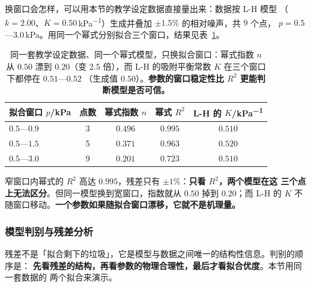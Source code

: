换窗口会怎样，可以用本节的教学设定数据直接量出来：数据按 L-H 模型
（$k=2.00$、$K=0.50$\,\unit{kPa^{-1}}）生成并叠加 $\pm1.5\%$ 的相对噪声，共 $9$ 个点，
$p=0.5$—$3.0$\,\unit{kPa}。用同一个幂式分别拟合三个窗口，结果见表~\ref{tab:ch10-window}。

\begin{table}[htbp]
\centering
\caption{同一套教学设定数据、同一个幂式模型，只换拟合窗口：幂式指数 $n$ 从 $0.50$ 漂到
$0.20$（变 $2.5$ 倍），而 L-H 的吸附平衡常数 $K$ 在三个窗口下都停在 $0.51$—$0.52$
（生成值 $0.50$）。\textbf{参数的窗口稳定性比 $R^2$ 更能判断模型是否可信。}
}
\label{tab:ch10-window}
\begin{tabularx}{\textwidth}{@{}l c c c c@{}}
\toprule
拟合窗口 $p$/\unit{kPa} & 点数 & 幂式指数 $n$ & 幂式 $R^{2}$ & L-H 的 $K$/\unit{kPa^{-1}} \\
\midrule
$0.5$—$0.9$ & 3 & $0.496$ & $0.995$ & $0.510$ \\
$0.5$—$1.5$ & 5 & $0.371$ & $0.963$ & $0.520$ \\
$0.5$—$3.0$ & 9 & $0.201$ & $0.723$ & $0.510$ \\
\bottomrule
\end{tabularx}
\end{table}

窄窗口内幂式的 $R^2$ 高达 $0.995$，残差只有 $\pm1\%$：\textbf{只看 $R^2$，两个模型在这
三个点上无法区分}。但同一模型换到宽窗口，指数就从 $0.50$ 掉到 $0.20$；而 L-H 的 $K$
不随窗口移动。\textbf{一个参数如果随拟合窗口漂移，它就不是机理量。}

\subsubsection{模型判别与残差分析}

残差不是「拟合剩下的垃圾」，它是模型与数据之间唯一的结构性信息。判别的顺序是：
\textbf{先看残差的结构，再看参数的物理合理性，最后才看拟合优度}。本节用同一套数据的
两个拟合来演示。

